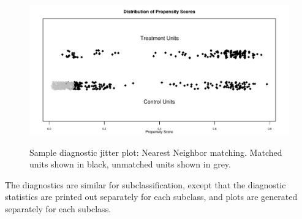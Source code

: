 \documentclass[oneside,letterpaper,titlepage]{article}
\begin{document}
\begin{figure}[tbp]
  \begin{center}
    {\includegraphics[scale=0.5]{figs/jitterplotnn}}
    \hfill
    \caption{Sample diagnostic jitter plot: Nearest Neighbor matching.  Matched units shown in black,
unmatched units shown in grey.}
\label{diagjitternn}
\end{center}
\end{figure}

The diagnostics are similar for subclassification, except that the
diagnostic statistics are printed out separately for each subclass,
and plots are generated separately for each subclass.
\end{document}

